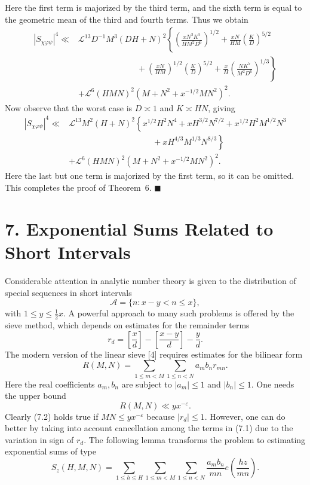 \documentclass[10pt]{article}
\begin{document}
Here the first term is majorized by the third term, and the sixth term is
equal to the geometric mean of the third and fourth terms. Thus we obtain
\[
\begin{aligned}
|S_{\chi\varphi\psi}|^4\ll{}&\mathscr L^{13}D^{-1}M^3(DH+N)^2
 \left\{\left(\frac{xN^3K^5}{HM^2D^6}\right)^{1/2}
 +\frac{xN}{HM}\left(\frac KD\right)^{5/2}\right.\\
&\left.\hspace{7em}
 +\left(\frac{xN}{HM}\right)^{1/2}\left(\frac KD\right)^{5/2}
 +\frac{x}{H}\left(\frac{NK^7}{M^2D^6}\right)^{1/3}\right\}\\
&+\mathscr L^6(HMN)^2\left(M+N^2+x^{-1/2}MN^2\right)^2.
\end{aligned}
\]
Now observe that the worst case is $D\asymp1$ and $K\asymp HN$, giving
\[
\begin{aligned}
|S_{\chi\varphi\psi}|^4\ll{}&\mathscr L^{13}M^2(H+N)^2
 \left\{x^{1/2}H^2N^4+xH^{3/2}N^{7/2}
 +x^{1/2}H^2M^{1/2}N^3\right.\\
&\left.\hspace{10em}{}+xH^{4/3}M^{1/3}N^{8/3}\right\}\\
&+\mathscr L^6(HMN)^2\left(M+N^2+x^{-1/2}MN^2\right)^2.
\end{aligned}
\]
Here the last but one term is majorized by the first term, so it can be
omitted. This completes the proof of Theorem~6. \(\blacksquare\)

\section*{7. Exponential Sums Related to Short Intervals}
Considerable attention in analytic number theory is given to the
distribution of special sequences in short intervals
\[
 \mathscr A=\{n:x-y<n\le x\},
\]
with $1\le y\le\frac12x$. A powerful approach to many such problems is
offered by the sieve method, which depends on estimates for the remainder
terms
\[
 r_d=\left[\frac xd\right]-\left[\frac{x-y}{d}\right]-\frac yd.
\]
The modern version of the linear sieve [4] requires estimates for the
bilinear form
\begin{equation*}
 R(M,N)=\sum_{1\le m<M}\sum_{1\le n<N}a_mb_nr_{mn}.
\tag{7.1}
\end{equation*}
Here the real coefficients $a_m,b_n$ are subject to $|a_m|\le1$ and
$|b_n|\le1$. One needs the upper bound
\begin{equation*}
 R(M,N)\ll yx^{-\varepsilon}.
\tag{7.2}
\end{equation*}
Clearly (7.2) holds true if $MN\le yx^{-\varepsilon}$ because $|r_d|\le1$.
However, one can do better by taking into account cancellation among the
terms in (7.1) due to the variation in sign of $r_d$. The following lemma
transforms the problem to estimating exponential sums of type
\[
 S_z(H,M,N)=\sum_{1\le h\le H}\sum_{1\le m<M}\sum_{1\le n<N}
 \frac{a_mb_n}{mn}e\left(\frac{hz}{mn}\right).
\]
\end{document}
